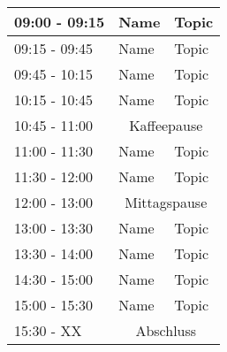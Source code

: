 \documentclass[fleqn,11pt,onecolumn]{SelfArxOneCol} %
\begin{document}
\renewcommand{\abstractname}{} %

\maketitle %

\thispagestyle{empty} %


\renewcommand{\arraystretch}{2}

\begin{table}[hbt]
	\centering
	\sffamily
	\begin{tabularx}{\textwidth}{|l|l|X|}
		\hline
		09:00 - 09:15 & Name & Topic \\
		\hline
		09:15 - 09:45 & Name & Topic \\
		\hline
		09:45 - 10:15 & Name & Topic \\
		\hline
		10:15 - 10:45 & Name & Topic \\
		\hline
		\cellcolor{color1!15}10:45 - 11:00 &  \multicolumn{2}{|c|}{\cellcolor{color1!15}Kaffeepause} \\
		\hline
		11:00 - 11:30 & Name & Topic \\
		\hline
		11:30 - 12:00 & Name & Topic \\
		\hline
		\cellcolor{color1!15}12:00 - 13:00 & \multicolumn{2}{|c|}{\cellcolor{color1!15}Mittagspause} \\
		\hline
		13:00 - 13:30 & Name & Topic \\
		\hline
		13:30 - 14:00 & Name & Topic \\
		\hline
		14:30 - 15:00 & Name & Topic \\
		\hline 
		15:00 - 15:30 & Name & Topic \\
		\hline
		\cellcolor{color1!15}15:30 - XX & \multicolumn{2}{|c|}{\cellcolor{color1!15}Abschluss}\\
		\hline
	\end{tabularx}
\end{table}




%
%

\end{document}
